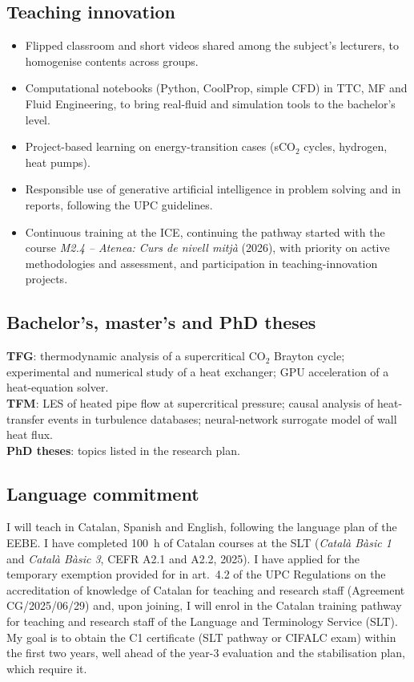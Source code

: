 \documentclass[11pt]{article}
\begin{document}
\subsection{Teaching innovation}
\begin{itemize}
\item Flipped classroom and short videos shared among the subject's lecturers, to
homogenise contents across groups.
\item Computational notebooks (Python, CoolProp, simple CFD) in TTC, MF and Fluid
Engineering, to bring real-fluid and simulation tools to the bachelor's level.
\item Project-based learning on energy-transition cases (sCO$_2$ cycles, hydrogen, heat
pumps).
\item Responsible use of generative artificial intelligence in problem solving and in
reports, following the UPC guidelines.
\item Continuous training at the ICE, continuing the pathway started with the course \emph{M2.4 -- Atenea: Curs de nivell mitj\`a} (2026), with priority on active methodologies and assessment, and participation in
teaching-innovation projects.
\end{itemize}

\subsection{Bachelor's, master's and PhD theses}\label{sec:theses}
\textbf{TFG}: thermodynamic analysis of a supercritical CO$_2$ Brayton cycle;
experimental and numerical study of a heat exchanger; GPU acceleration of a
heat-equation solver.\\
\textbf{TFM}: LES of heated pipe flow at supercritical pressure; causal analysis of
heat-transfer events in turbulence databases; neural-network surrogate model of wall
heat flux.\\
\textbf{PhD theses}: topics listed in the research plan.

\subsection{Language commitment}
I will teach in Catalan, Spanish and English, following the language plan of the
EEBE. I have completed 100~h of Catalan courses at the SLT
(\emph{Catal\`a B\`asic 1} and \emph{Catal\`a B\`asic 3}, CEFR A2.1 and A2.2, 2025). I have applied for the temporary exemption provided for in
art.~4.2 of the UPC Regulations on the accreditation of knowledge of Catalan for teaching
and research staff (Agreement CG/2025/06/29) and, upon joining, I will enrol in the
Catalan training pathway for teaching and research staff of the Language and Terminology
Service (SLT). My goal is to obtain the C1 certificate (SLT pathway or CIFALC exam)
within the first two years, well ahead of the year-3 evaluation and the stabilisation
plan, which require it.
\end{document}
